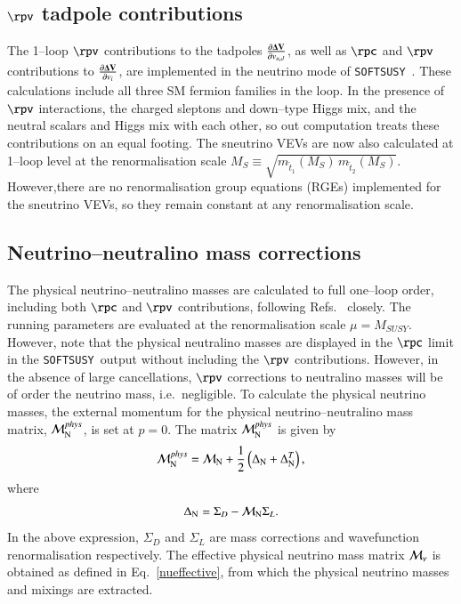 \documentclass[pdflatex,final,3p,times]{elsarticle}
\def\SOFTSUSY{{\tt SOFTSUSY}}
\begin{document}
\subsection{$\rpv$ tadpole contributions \label{tadpole}}

The 1--loop $\rpv$ contributions to the tadpoles $\frac{\partial {\bf
    \Delta V}}{\partial v_{u,d}}$, as well as $\rpc$ and $\rpv$
contributions to $\frac{\partial {\bf \Delta V}}{\partial v_{i}}$, are
implemented in the neutrino mode of \SOFTSUSY~. These calculations include 
all three SM fermion families in the loop.  In the presence of $\rpv$
interactions, the charged 
sleptons and down--type Higgs mix, and the neutral scalars and Higgs mix with
each other, so out computation treats these contributions on an equal
footing.   
The sneutrino VEVs are now also 
calculated at 1--loop level at the renormalisation scale $M_S \equiv
\sqrt{m_{\tilde t_1}(M_S) \,m_{\tilde t_2}(M_S)}$.  
However,there are no renormalisation group equations (RGEs) implemented for
the sneutrino VEVs, so 
they remain constant at any renormalisation scale. 

\subsection{Neutrino--neutralino mass corrections}

The physical neutrino--neutralino masses are calculated to full
one--loop order, including both $\rpc$ and $\rpv$ contributions,
following Refs.~\cite{Dedes:2006ni,Allanach:2007qc} closely.  The
running parameters are evaluated at the renormalisation scale
$\mu=M_{SUSY}$. However, note that the physical neutralino masses
are displayed in the $\rpc$ limit in the \SOFTSUSY~output
without including the $\rpv$ contributions.  
However, in the absence of large cancellations, $\rpv$ corrections to
neutralino masses will be of order
the neutrino mass, i.e.\ negligible. 
To calculate the physical neutrino masses,
the external momentum for the physical neutrino--neutralino mass
matrix, ${\cal M}_{\rm N}^{phys}$, is set at $p=0$.  The matrix ${\cal
  M}_{\rm N}^{phys}$ is given by
\begin{equation}
  {\cal M}_{\rm N}^{phys} = {\cal M}_{\rm N} +
  \frac{1}{2}\left(\Delta_{\rm N} + \Delta^T_{\rm N}\right),
\end{equation}
where
\begin{equation}
  \Delta_{\rm N} = \Sigma_D - {\cal M}_{\rm N}\Sigma_L.
\end{equation}
In the above expression, $\Sigma_D$ and $\Sigma_L$ are mass
corrections and wavefunction renormalisation respectively.  The
effective physical neutrino mass matrix ${\cal M}_{\nu}$ is obtained
as defined in Eq.~\ref{nueffective}, from which the physical neutrino
masses and mixings are extracted.
\end{document}
